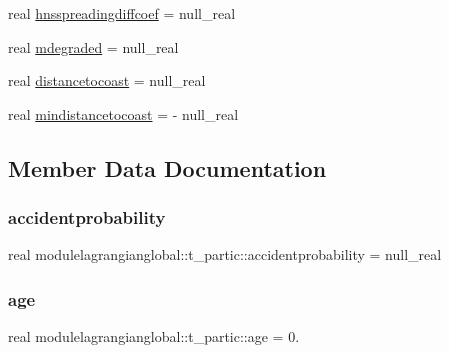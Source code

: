 \begin{DoxyCompactItemize}
\item 
real \mbox{\hyperlink{structmodulelagrangianglobal_1_1t__partic_a6f841458716432c80431a26c2fe78f2f}{hnsspreadingdiffcoef}} = null\+\_\+real
\item 
real \mbox{\hyperlink{structmodulelagrangianglobal_1_1t__partic_a59c6c4f0146d8333e1ce642b6027438c}{mdegraded}} = null\+\_\+real
\item 
real \mbox{\hyperlink{structmodulelagrangianglobal_1_1t__partic_ab24d90c701afe15b1ac4fcbe287803b4}{distancetocoast}} = null\+\_\+real
\item 
real \mbox{\hyperlink{structmodulelagrangianglobal_1_1t__partic_a3e9a2ed68b272c683c1fec0feb51c93f}{mindistancetocoast}} = -\/ null\+\_\+real
\end{DoxyCompactItemize}


\subsection{Member Data Documentation}
\mbox{\label{structmodulelagrangianglobal_1_1t__partic_ab8547141f63be6f304ae54831429a47f}} 
\subsubsection{\texorpdfstring{accidentprobability}{accidentprobability}}
{\footnotesize\ttfamily real modulelagrangianglobal\+::t\+\_\+partic\+::accidentprobability = null\+\_\+real\hspace{0.3cm}{\ttfamily [private]}}

\mbox{\label{structmodulelagrangianglobal_1_1t__partic_a033777cff563f85fae9cba3bc9774676}} 
\subsubsection{\texorpdfstring{age}{age}}
{\footnotesize\ttfamily real modulelagrangianglobal\+::t\+\_\+partic\+::age = 0.\hspace{0.3cm}{\ttfamily [private]}}

